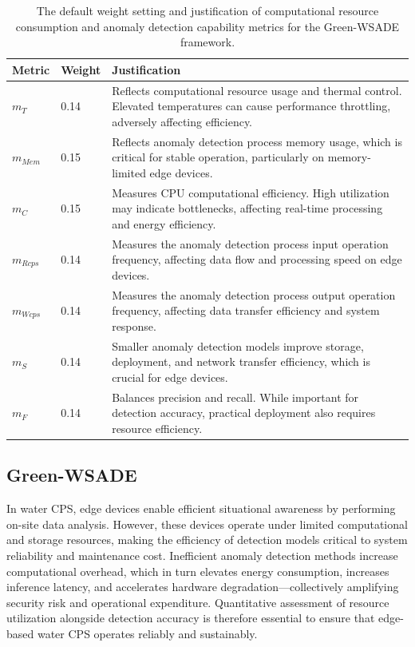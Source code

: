 \documentclass[pdflatex,sn-mathphys-num]{sn-jnl}%
\theoremstyle{thmstyleone}
\theoremstyle{thmstyletwo}%
\theoremstyle{thmstylethree}%
\begin{document}
\begin{table}[htbp]
    \centering
    \scriptsize
    \caption{The default weight setting and justification of computational resource consumption and anomaly detection capability metrics for the Green-WSADE framework.}
    \begin{tabularx}{\linewidth}{|p{1cm}|p{1cm}|X|}
    \toprule
    Metric & Weight & Justification \\
    \midrule
      $m_{T}$ & 0.14 & Reflects computational resource usage and thermal control. Elevated temperatures can cause performance throttling, adversely affecting efficiency. \\
    \midrule
      $m_{Mem}$ & 0.15 & Reflects anomaly detection process memory usage, which is critical for stable operation, particularly on memory-limited edge devices.  \\
    \midrule
     $m_{C}$ &  0.15  & Measures CPU computational efficiency. High utilization may indicate bottlenecks, affecting real-time processing and energy efficiency. \\
    \midrule   
    $m_{Rcps}$ &  0.14  & Measures the anomaly detection process input operation frequency, affecting data flow and processing speed on edge devices.\\
    \midrule
     $m_{Wcps}$ &  0.14 & Measures the anomaly detection process output operation frequency, affecting data transfer efficiency and system response.\\
    \midrule
     $m_{S}$ &  0.14 & Smaller anomaly detection models improve storage, deployment, and network transfer efficiency, which is crucial for edge devices. \\
    \midrule
     $m_{F}$ & 0.14 & Balances precision and recall. While important for detection accuracy, practical deployment also requires resource efficiency. \\
    \bottomrule
    \end{tabularx}
    \label{tab: Green-WSADE-weights}
\end{table}

\subsection{Green-WSADE} \label{method: Green-WSADE}
In water CPS, edge devices enable efficient situational awareness by performing on-site data analysis. However, these devices operate under limited computational and storage resources, making the efficiency of detection models critical to system reliability and maintenance cost. Inefficient anomaly detection methods increase computational overhead, which in turn elevates energy consumption, increases inference latency, and accelerates hardware degradation---collectively amplifying security risk and operational expenditure. Quantitative assessment of resource utilization alongside detection accuracy is therefore essential to ensure that edge-based water CPS operates reliably and sustainably.
\end{document}
